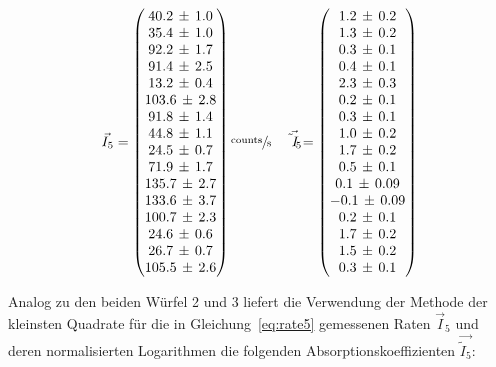 \begin{equation}
	\vec{I}_5=
	\begin{pmatrix}
		40.2\,\pm\,1.0 \\
		35.4\,\pm\,1.0 \\
		92.2\,\pm\,1.7 \\
		91.4\,\pm\,2.5 \\
		13.2\,\pm\,0.4 \\
    103.6\,\pm\,2.8 \\
		91.8\,\pm\,1.4 \\
		44.8\,\pm\,1.1 \\
		24.5\,\pm\,0.7 \\
		71.9\,\pm\,1.7 \\
		135.7\,\pm\,2.7 \\
    133.6\,\pm\,3.7 \\
		100.7\,\pm\,2.3 \\
		24.6\,\pm\,0.6 \\
		26.7\,\pm\,0.7 \\
		105.5\,\pm\,2.6
	\end{pmatrix}
	\sfrac{\text{counts}}{\text{s}}\quad
	\vec{\tilde{I}_5}=
	\begin{pmatrix}
    1.2\,\pm\,0.2 \\
		1.3\,\pm\,0.2 \\
		0.3\,\pm\,0.1 \\
		0.4\,\pm\,0.1 \\
		2.3\,\pm\,0.3 \\
    0.2\,\pm\,0.1 \\
		0.3\,\pm\,0.1 \\
		1.0\,\pm\,0.2 \\
		1.7\,\pm\,0.2 \\
		0.5\,\pm\,0.1 \\
		0.1\,\pm\,0.09 \\
    -0.1\,\pm\,0.09 \\
		0.2\,\pm\,0.1 \\
		1.7\,\pm\,0.2 \\
		1.5\,\pm\,0.2 \\
		0.3\,\pm\,0.1
	\end{pmatrix}
	\label{eq:rate5}
\end{equation}

Analog zu den beiden Würfel 2 und 3 liefert die Verwendung der Methode der kleinsten Quadrate für die in
Gleichung~\eqref{eq:rate5} gemessenen Raten $\vec{I}_5$ und deren normalisierten Logarithmen
die folgenden Absorptionskoeffizienten $\vec{\tilde{I}_5}$:

